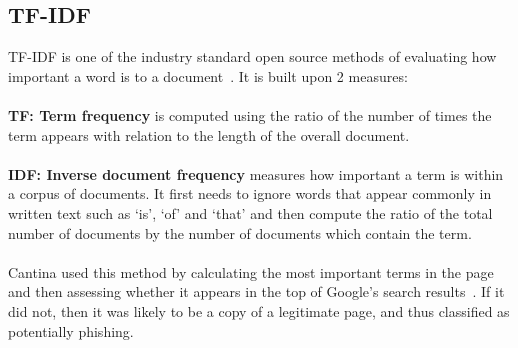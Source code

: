 \documentclass[12pt,twoside]{report}
\begin{document}
\subsection{TF-IDF}
TF-IDF is one of the industry standard open source methods of evaluating how important a word is to a document~\cite{tfidf}. It is built upon 2 measures:
\\\\
\textbf{TF: Term frequency} is computed using the ratio of the number of times the term appears with relation to the length of the overall document.
\\\\
\textbf{IDF: Inverse document frequency} measures how important a term is within a corpus of documents. It first needs to ignore words that appear commonly in written text such as `is', `of' and `that' and then compute the ratio of the total number of documents by the number of documents which contain the term.
\\\\
Cantina used this method by calculating the most important terms in the page and then assessing whether it appears in the top of Google's search results~\cite{cantina}. If it did not, then it was likely to be a copy of a legitimate page, and thus classified as potentially phishing.
\end{document}
